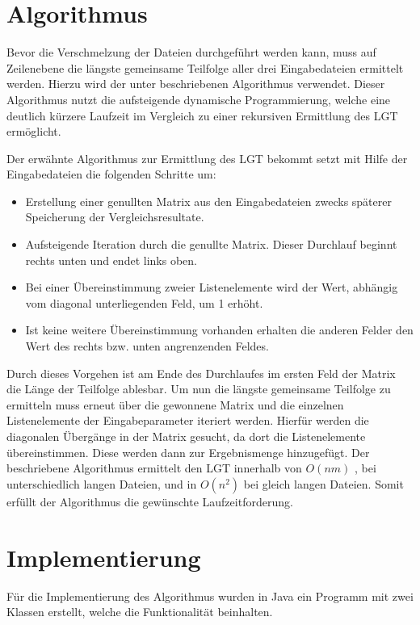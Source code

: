 \documentclass[a4paper,titlepage,12pt]{scrartcl}
\begin{document}
\section{Algorithmus}
\label{sec:algorithm}
Bevor die Verschmelzung der Dateien durchgeführt werden kann, muss auf Zeilenebene die längste gemeinsame Teilfolge aller drei Eingabedateien ermittelt werden.
Hierzu wird der unter \citet{www:EP96} beschriebenen Algorithmus verwendet. Dieser Algorithmus nutzt die aufsteigende dynamische Programmierung,
welche eine deutlich kürzere Laufzeit im Vergleich zu einer rekursiven Ermittlung des LGT ermöglicht.

Der erwähnte Algorithmus zur Ermittlung des LGT bekommt setzt mit Hilfe der Eingabedateien die folgenden Schritte um:

\begin{itemize}
\item Erstellung einer genullten Matrix aus den Eingabedateien zwecks späterer Speicherung der Vergleichsresultate.
\item Aufsteigende Iteration durch die genullte Matrix. Dieser Durchlauf beginnt rechts unten und endet links oben.
\item Bei einer Übereinstimmung zweier Listenelemente wird der Wert, abhängig vom diagonal unterliegenden Feld, um 1 erhöht.
\item Ist keine weitere Übereinstimmung vorhanden erhalten die anderen Felder den Wert des rechts bzw. unten angrenzenden Feldes.
\end{itemize}

Durch dieses Vorgehen ist am Ende des Durchlaufes im ersten Feld der Matrix die Länge der Teilfolge ablesbar.
Um nun die längste gemeinsame Teilfolge zu ermitteln muss erneut über die gewonnene Matrix und die einzelnen Listenelemente der Eingabeparameter iteriert werden.
Hierfür werden die diagonalen Übergänge in der Matrix gesucht, da dort die Listenelemente übereinstimmen. Diese werden dann zur Ergebnismenge hinzugefügt.
Der beschriebene Algorithmus ermittelt den LGT innerhalb von $O(nm)$ , bei unterschiedlich langen Dateien, und in $O(n^2)$ bei gleich langen Dateien. Somit erfüllt der Algorithmus die gewünschte Laufzeitforderung.


\section{Implementierung}
\label{sec:implementation}
Für die Implementierung des Algorithmus wurden in Java ein Programm mit zwei Klassen erstellt, welche die Funktionalität beinhalten.
\end{document}

